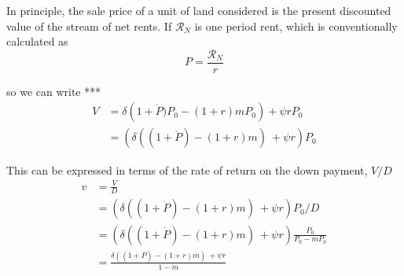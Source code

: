 

In principle, the  sale price of a unit of land considered is the present discounted value of the stream of net rents. If $\mathcal{R}_N$ is one period rent, which is conventionally calculated as
\begin{equation}
  P=\frac{\mathcal{R}_N}{r}  
\label{eq:Capitalization}
\end{equation}


\noindent so we can write ***
\begin{align}  
    V & = \delta \left(1+\dot P)  P_0- (1+r)mP_0 \right)  + \psi rP_0  \\
      & =\left( \delta ((1+\dot P)  - (1+r)m)\  + \psi r\right)P_0
\end{align}

This can be expressed in terms of the rate of return on the down payment, $V/D$
\begin{align}  
   v & = \frac{V}{D}
   \\
    & = \left( \delta ((1+\dot P)  - (1+r)m)\  + \psi r\right)P_0/D
   \\
    & = \left( \delta ((1+\dot P)  - (1+r)m)\  + \psi r\right) \frac{P_0}{P_0-mP_0}
    \\
    & =  \frac{\delta ((1+\dot P)  - (1+r)m)\  + \psi r}{1-m}
\label{eq:RULE}
\end{align}

